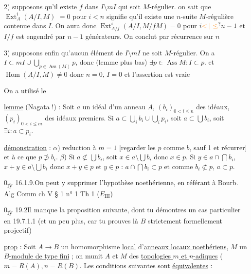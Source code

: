 2) supposons qu'il existe $f$ dans $I\setminus mI$ qui soit $M$-régulier. on sait que $\operatorname{Ext}^i_A(A/I,M)$  $=0$ pour $i<n$ signifie qu'il existe une $n$-suite $M$-régulière contenue dans $I$. On aura donc $\operatorname{Ext}^i_{A/f}(A/I,M/fM)=0$ pour $i\unsure{<|\leq}n-1$ et $I/f$ est engendré par $n-1$ générateurs. On conclut par récurrence sur $n$

3) supposons enfin qu'aucun élément de $I\setminus mI$ ne soit $M$-régulier. On a $I\subset mI\cup\bigcup_{p\in\operatorname{Ass}(M)}p$, donc (lemme plus bas) $\exists p\in\operatorname{Ass}M:I\subset p$. et $\operatorname{Hom}(A/I,M)\ne0$ donc $n=0$, $I=0$ et l'assertion est vraie

On a utilisé le

\uline{lemme} (Nagata !) : Soit $a$ un idéal d'un anneau $A$, $(b_i)_{0<i\leq n}$ des idéaux, $(p_i)_{0<i\leq m}$ des idéaux premiers. Si $a\subset\bigcup_i b_i\cup\bigcup_i p_i$, soit $a\subset\bigcup b_i$, soit $\exists i:a\subset p_i$.

\uline{démonstration} : $\alpha$) reduction à $m=1$ [regarder les $p$ comme $b$, sauf 1 et récurrer] et à ce que $p\not\supset b_i$. $\beta$) Si $a\not\subset\bigcup b_i$, soit $x\in a\setminus\bigcup b_i$ donc $x\in p$. Si $y\in a\cap\bigcap b_i$, $x+y\in a\setminus\bigcup b_i$ donc $x+y\in p$ et $y\in p$ : $a\cap\bigcap b_i\subset p$ et comme $b_i\not\subset p$, $a\subset p$.


$0_{\overline{\underline{\mathrm{IV}}}}$ 16.1.9.\qquad On peut y supprimer l'hypothèse noethérienne, en référant à Bourb. Alg Comm ch V § 1 n° 1 Th 1 ($E_{\mathrm{III}}$)

$0_{\overline{\underline{\mathrm{IV}}}}$ 19.2\qquad Il manque la proposition suivante, dont tu démontres un cas particulier en 19.7.1.1 (et un peu plus, car tu prouves là $B$ strictement formellement projectif)

\uline{prop} : Soit $A\longrightarrow B$ un homomorphisme \uline{local} d'\uline{anneaux locaux noethériens}, \uline{$M$} un \uline{$B$-module de type fini} ; on munit $A$ et $M$ des \uline{topologies $m$ et $n$-adiques} ($m=R(A),n=R(B)$. Les conditions suivantes sont \uline{équivalentes} :


